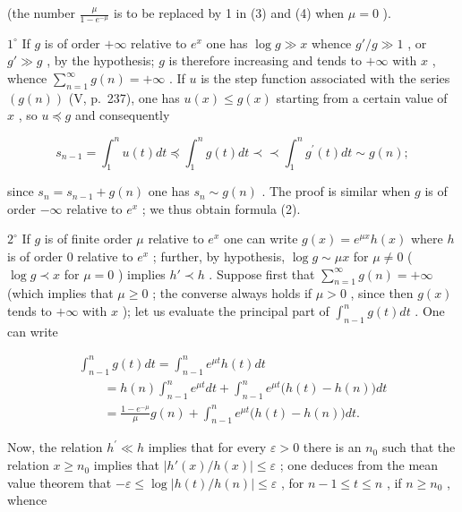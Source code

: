 (the number \(\frac{\mu}{1 - e^{-\mu}}\) is to be replaced by 1 in (3) and (4) when \(\mu = 0\) ).

\(1^{\circ}\) If \(g\) is of order \(+\infty\) relative to \(e^{x}\) one has \(\log g \gg x\) whence \(g' / g \gg 1\) , or \(g' \gg g\) , by the hypothesis; \(g\) is therefore increasing and tends to \(+\infty\) with \(x\) , whence \(\sum_{n=1}^{\infty} g(n) = +\infty\) . If \(u\) is the step function associated with the series \((g(n))\) (V, p.~237), one has \(u(x) \leqslant g(x)\) starting from a certain value of \(x\) , so \(u \preccurlyeq g\) and consequently

\[
s _ {n - 1} = \int_ {1} ^ {n} u (t) d t \preccurlyeq \int_ {1} ^ {n} g (t) d t \prec \prec \int_ {1} ^ {n} g ^ {\prime} (t) d t \sim g (n);
\]

since \(s_n = s_{n-1} + g(n)\) one has \(s_n \sim g(n)\) . The proof is similar when \(g\) is of order \(-\infty\) relative to \(e^x\) ; we thus obtain formula (2).

\(2^{\circ}\) If \(g\) is of finite order \(\mu\) relative to \(e^{x}\) one can write \(g(x) = e^{\mu x}h(x)\) where \(h\) is of order 0 relative to \(e^{x}\) ; further, by hypothesis, \(\log g \sim \mu x\) for \(\mu \neq 0\) ( \(\log g \prec x\) for \(\mu = 0\) ) implies \(h' \prec h\) . Suppose first that \(\sum_{n=1}^{\infty} g(n) = +\infty\) (which implies that \(\mu \geqslant 0\) ; the converse always holds if \(\mu > 0\) , since then \(g(x)\) tends to \(+\infty\) with \(x\) ); let us evaluate the principal part of \(\int_{n-1}^{n} g(t) dt\) . One can write

\[
\begin{array}{l} \int_ {n - 1} ^ {n} g (t) d t = \int_ {n - 1} ^ {n} e ^ {\mu t} h (t) d t \\ \qquad = h (n) \int_ {n - 1} ^ {n} e ^ {\mu t} d t + \int_ {n - 1} ^ {n} e ^ {\mu t} \big (h (t) - h (n) \big) d t \\ \qquad = \frac {1 - e ^ {- \mu}}{\mu} g (n) + \int_ {n - 1} ^ {n} e ^ {\mu t} \big (h (t) - h (n) \big) d t. \end{array}
\]

Now, the relation \(h^{\prime} \ll h\) implies that for every \(\varepsilon > 0\) there is an \(n_{0}\) such that the relation \(x \geqslant n_{0}\) implies that \(\left|h'(x)/h(x)\right| \leqslant \varepsilon\) ; one deduces from the mean value theorem that \(-\varepsilon \leqslant \log |h(t)/h(n)| \leqslant \varepsilon\) , for \(n - 1 \leqslant t \leqslant n\) , if \(n \geqslant n_{0}\) , whence

